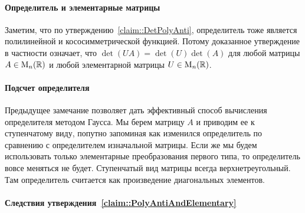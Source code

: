 \paragraph{Определитель и элементарные матрицы}

Заметим, что по утверждению~\ref{claim::DetPolyAnti}, определитель тоже является полилинейной и кососимметрической функцией.
Потому доказанное утверждение в частности означает, что $\det(UA) = \det(U)\det(A)$ для любой матрицы $A\in\operatorname{M}_{n}(\mathbb R)$ и любой элементарной матрицы $U\in\operatorname{M}_{n}(\mathbb R)$.

\paragraph{Подсчет определителя}

Предыдущее замечание позволяет дать эффективный способ вычисления определителя методом Гаусса.
Мы берем матрицу $A$ и приводим ее к ступенчатому виду, попутно запоминая как изменился определитель по сравнению с определителем изначальной матрицы.
Если же мы будем использовать только элементарные преобразования первого типа, то определитель вовсе меняться не будет.
Ступенчатый вид матрицы всегда верхнетреугольный.
Там определитель считается как произведение диагональных элементов.


\paragraph{Следствия утверждения~\ref{claim::PolyAntiAndElementary}}

